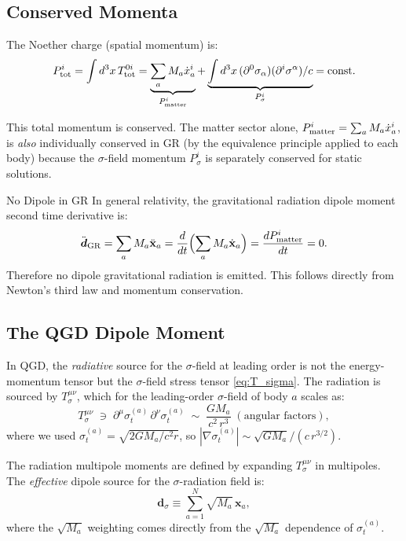 \documentclass[11pt,a4paper]{article}
\theoremstyle{definition}
\theoremstyle{remark}
\newcommand{\sig}[2]{\sigma_{#1}^{(#2)}}
\newcommand{\boldx}{\mathbf{x}}
\begin{document}
	\subsection{Conserved Momenta}
	
	The Noether charge (spatial momentum) is:
	\begin{equation}
		P^i_{\rm tot}
		= \int d^3x\,T^{0i}_{\rm tot}
		= \underbrace{\sum_a M_a\dot{x}_a^i}_{P^i_{\rm matter}}
		+ \underbrace{\int d^3x\,(\partial^0\sigma_\alpha)(\partial^i\sigma^\alpha)/c}_{P^i_\sigma}
		= \text{const}.
		\label{eq:P_total_conserved}
	\end{equation}
	
	This total momentum is conserved.  The matter sector alone,
	$P^i_{\rm matter}=\sum_a M_a\dot{x}_a^i$, is \emph{also} individually
	conserved in GR (by the equivalence principle applied to each body)
	because the $\sigma$-field momentum $P^i_\sigma$ is separately
	conserved for static solutions.
	
	No Dipole in GR
		In general relativity, the gravitational radiation dipole moment second time
		derivative is:
		\begin{equation}
			\ddot{\boldsymbol{d}}_{\rm GR}
			= \sum_a M_a\ddot{\boldx}_a
			= \frac{d}{dt}\Bigl(\sum_a M_a\dot{\boldx}_a\Bigr)
			= \frac{dP^i_{\rm matter}}{dt}
			= 0.
			\label{eq:gr_no_dipole}
		\end{equation}
		Therefore no dipole gravitational radiation is emitted.
		This follows directly from Newton's third law and momentum conservation.
	
	\subsection{The QGD Dipole Moment}
	
	In QGD, the \emph{radiative} source for the $\sigma$-field at
	leading order is not the energy-momentum tensor but the
	$\sigma$-field stress tensor \eqref{eq:T_sigma}.  The radiation
	is sourced by $T^{\mu\nu}_\sigma$, which for the leading-order
	$\sigma$-field of body $a$ scales as:
	\begin{equation}
		T^{\mu\nu}_\sigma
		\;\ni\;
		\partial^\mu\sig{t}{a}\,\partial^\nu\sig{t}{a}
		\;\sim\;
		\frac{G M_a}{c^2\,r^3}\;(\text{angular factors}),
		\label{eq:T_sigma_scaling}
	\end{equation}
	where we used $\sig{t}{a}=\sqrt{2GM_a/c^2 r}$, so
	$|\nabla\sig{t}{a}|\sim\sqrt{GM_a}/(c\,r^{3/2})$.
	
	The radiation multipole moments are defined by expanding
	$T^{\mu\nu}_\sigma$ in multipoles.  The \emph{effective} dipole source
	for the $\sigma$-radiation field is:
	\begin{equation}
		\boxed{
			\boldsymbol{d}_\sigma
			\equiv
			\sum_{a=1}^N \sqrt{M_a}\,\boldx_a,
		}
		\label{eq:qgd_dipole}
	\end{equation}
	where the $\sqrt{M_a}$ weighting comes directly from the $\sqrt{M_a}$
	dependence of $\sig{t}{a}$.
	
\end{document}
